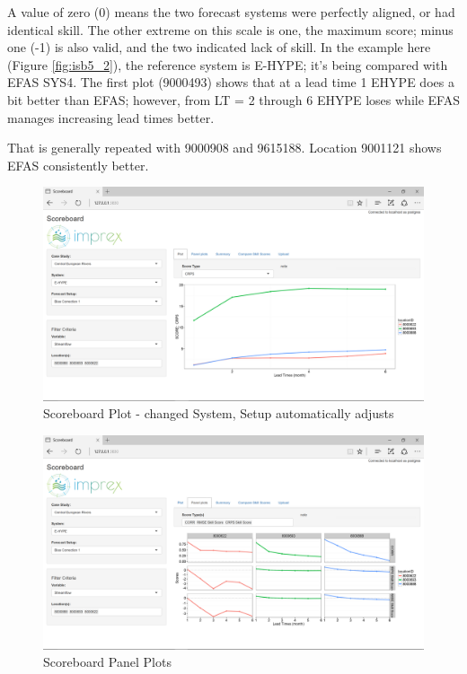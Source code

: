 \documentclass[logos,parttoc,morelanguage=french,morelanguage=german]{orsay-memoire}
\begin{document}
A value of zero (0) means the two forecast systems were perfectly aligned, or had identical skill. The other extreme on this scale is one, the maximum score; minus one (-1) is also valid, and the two indicated lack of skill. In the example here (Figure \ref{fig:isb5_2}), the reference system is E-HYPE; it's being compared with EFAS SYS4. The first plot (9000493) shows that at a lead time 1 EHYPE does a bit better than EFAS; however, from LT = 2 through 6 EHYPE loses while EFAS manages increasing lead times better.

That is generally repeated with 9000908 and 9615188. Location 9001121 shows EFAS consistently better.


\begin{figure}[h]
\centering
\includegraphics[width=0.80\linewidth]{images/isb6.png}
  \caption{Scoreboard Plot - changed System, Setup automatically adjusts}
  \label{fig:isb6}
\end{figure}

\begin{figure}[h]
\centering
\includegraphics[width=0.80\linewidth]{images/isb7.png}
  \caption{Scoreboard Panel Plots}
  \label{fig:isb7}
\end{figure}

\end{document}
